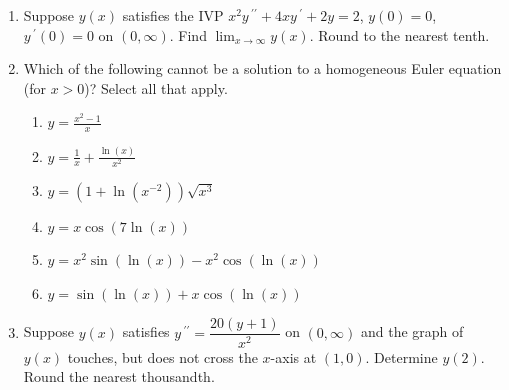 \documentclass{ximera}
\begin{document}
\begin{enumerate}[label=(\arabic*)]









\item Suppose $y(x)$ satisfies the IVP $x^2 y\,^{\prime\prime}+4x y\,^{\prime}+2y=2$, $y(0)=0$, $y\,^{\prime}(0)=0$  on $(0,\infty)$.  Find $\displaystyle \lim_{x\rightarrow \infty}y(x)$.  Round to the nearest tenth.




\item  Which of the following cannot be a solution to a homogeneous Euler equation (for $x>0$)?  Select all that apply.

\begin{enumerate}[label=(\alph*)]
\item $\displaystyle y=\frac{x^2-1}{x}$ 
\item $\displaystyle y=\frac{1}{x}+\frac{\ln(x)}{x^2}$  %
\item $y=(1+\ln(x^{-2}))\sqrt{x^3}$
\item $y=x\cos{\left(7\ln{(x)}\right)}$
\item $y=x^2\sin{\left(\ln{(x)}\right)}-x^2\cos{\left(\ln{(x)}\right)}$
\item $y=\sin{\left(\ln{(x)}\right)}+x\cos{\left(\ln{(x)}\right)}$ %
\end{enumerate}


\newpage

\item Suppose $y(x)$ satisfies $y\,^{\prime\prime}=\dfrac{20(y+1)}{x^2}$ on $(0,\infty)$ and the graph of $y(x)$ touches, but does not cross the $x$-axis at $(1,0)$.  Determine $y(2)$.  Round the nearest thousandth.








\end{enumerate}
\end{document}
